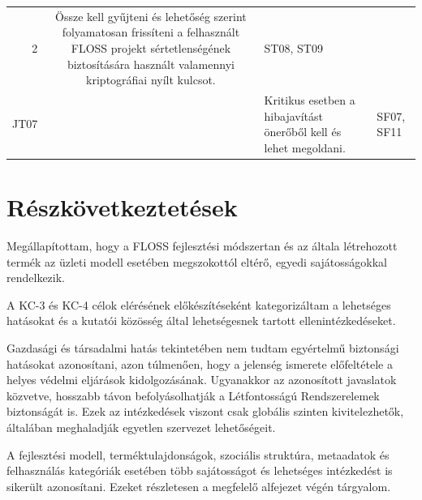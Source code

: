 \documentclass[12pt,magyar,a4paper,oneside]{scrreprt}
\begin{document}
\begin{longtable}[]{@{}rcll@{}}
\begin{minipage}[t]{0.03\columnwidth}
2\strut
\end{minipage} & \begin{minipage}[t]{0.69\columnwidth}\raggedright
Össze kell gyűjteni és lehetőség szerint folyamatosan frissíteni a
felhasznált FLOSS projekt sértetlenségének biztosítására használt
valamennyi kriptográfiai nyílt kulcsot.\strut
\end{minipage} & \begin{minipage}[t]{0.13\columnwidth}\raggedright
ST08, ST09\strut
\end{minipage}\tabularnewline
\begin{minipage}[t]{0.03\columnwidth}\raggedleft
JT07\strut
\end{minipage} & \begin{minipage}[t]{0.03\columnwidth}\centering
3\strut
\end{minipage} & \begin{minipage}[t]{0.69\columnwidth}\raggedright
Kritikus esetben a hibajavítást önerőből kell és lehet megoldani.\strut
\end{minipage} & \begin{minipage}[t]{0.13\columnwidth}\raggedright
SF07, SF11\strut
\end{minipage}\tabularnewline
\bottomrule
\end{longtable}

\hypertarget{ruxe9szkuxf6vetkeztetuxe9sek-1}{%
\section{Részkövetkeztetések}\label{ruxe9szkuxf6vetkeztetuxe9sek-1}}

Megállapítottam, hogy a FLOSS fejlesztési módszertan és az általa
létrehozott termék az üzleti modell esetében megszokottól eltérő, egyedi
sajátosságokkal rendelkezik.

A KC-3 és KC-4 célok elérésének előkészítéseként kategorizáltam a
lehetséges hatásokat és a kutatói közösség által lehetségesnek tartott
ellenintézkedéseket.

Gazdasági és társadalmi hatás tekintetében nem tudtam egyértelmű
biztonsági hatásokat azonosítani, azon túlmenően, hogy a jelenség
ismerete előfeltétele a helyes védelmi eljárások kidolgozásának.
Ugyanakkor az azonosított javaslatok közvetve, hosszabb távon
befolyásolhatják a Létfontosságú Rendszerelemek biztonságát is. Ezek az
intézkedések viszont csak globális szinten kivitelezhetők, általában
meghaladják egyetlen szervezet lehetőségeit.

A fejlesztési modell, terméktulajdonságok, szociális struktúra,
metaadatok és felhasználás kategóriák esetében több sajátosságot és
lehetséges intézkedést is sikerült azonosítani. Ezeket részletesen a
megfelelő alfejezet végén tárgyalom.
\end{document}

